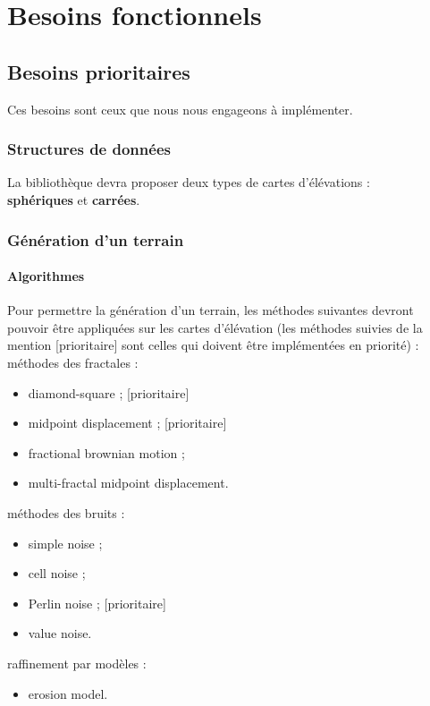 

\chapter{Besoins fonctionnels}

\section{Besoins prioritaires}

Ces besoins sont ceux que nous nous engageons à implémenter.

\subsection{Structures de données}
La bibliothèque devra proposer deux types de cartes d'élévations :\\
\textbf{sphériques} et \textbf{carrées}.

\subsection{Génération d'un terrain}
\subsubsection{Algorithmes}
Pour permettre la génération d'un terrain, les méthodes suivantes devront pouvoir
 être appliquées sur les cartes d'élévation (les méthodes suivies de la mention [prioritaire] sont celles qui doivent \^etre implémentées en priorité) :\\

\noindent méthodes des fractales :
\begin{itemize}
\item diamond-square ; [prioritaire]
\item midpoint displacement ; [prioritaire]
\item fractional brownian motion ;
\item multi-fractal midpoint displacement.
\end{itemize}
méthodes des bruits :
\begin{itemize}
\item simple noise ;
\item cell noise ;
\item Perlin noise ; [prioritaire]
\item value noise.
\end{itemize}
raffinement par modèles :
\begin{itemize}
\item erosion model.
\end{itemize}

